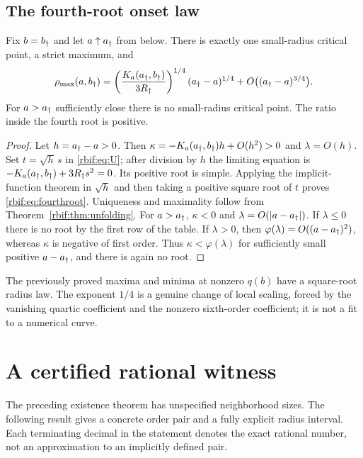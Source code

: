 \subsection{The fourth-root onset law}
\begin{corollary}
\label{rbif:cor:fourthroot}
Fix $b=b_\dagger$ and let $a\uparrow a_\dagger$ from below. There is exactly
one small-radius critical point, a strict maximum, and
\begin{equation}
 \rho_{\max}(a,b_\dagger)
 =\left(\frac{K_a(a_\dagger,b_\dagger)}{3R_\dagger}\right)^{1/4}
       (a_\dagger-a)^{1/4}
       +O\bigl((a_\dagger-a)^{3/4}\bigr).
 \label{rbif:eq:fourthroot}
\end{equation}
For $a>a_\dagger$ sufficiently close there is no small-radius critical
point. The ratio inside the fourth root is positive.
\end{corollary}
\begin{proof}
Let $h=a_\dagger-a>0$. Then
$\kappa=-K_a(a_\dagger,b_\dagger)h+O(h^2)>0$ and $\lambda=O(h)$.
Set $t=\sqrt h\,s$ in \eqref{rbif:eq:U}; after division by $h$ the
limiting equation is
$-K_a(a_\dagger,b_\dagger)+3R_\dagger s^2=0$.
Its positive root is simple. Applying the implicit-function theorem in
$\sqrt h$ and then taking a positive square root of $t$ proves
\eqref{rbif:eq:fourthroot}. Uniqueness and maximality follow from
Theorem~\ref{rbif:thm:unfolding}.
For $a>a_\dagger$, $\kappa<0$ and $\lambda=O(|a-a_\dagger|)$.
If $\lambda\le0$ there is no root by the first row of the table.
If $\lambda>0$, then
$\varphi(\lambda)=O((a-a_\dagger)^2)$, whereas $\kappa$ is negative
of first order. Thus $\kappa<\varphi(\lambda)$ for sufficiently small
positive $a-a_\dagger$, and there is again no root.
\end{proof}

The previously proved maxima and minima at nonzero $q(b)$ have a
square-root radius law. The exponent $1/4$ is a genuine change of local
scaling, forced by the vanishing quartic coefficient and the nonzero
sixth-order coefficient; it is not a fit to a numerical curve.

\section{A certified rational witness}
\label{rbif:sec:witness}
The preceding existence theorem has unspecified neighborhood sizes.
The following result gives a concrete order pair and a fully explicit
radius interval. Each terminating decimal in the statement denotes the
exact rational number, not an approximation to an implicitly defined pair.


